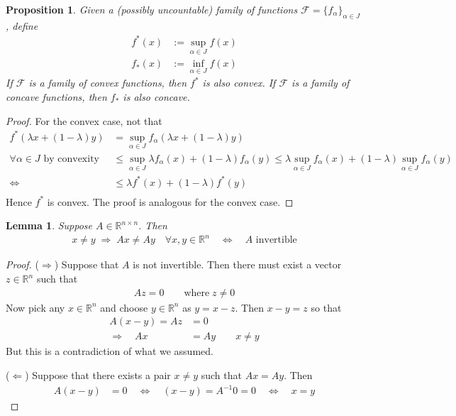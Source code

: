 \documentclass[12pt]{book}
\numberwithin{equation}{section} %
\theoremstyle{plain}
\newtheorem{lem}[thm]{Lemma}
\newtheorem{prop}[thm]{Proposition}
\theoremstyle{definition}
\theoremstyle{remark}
\newcommand{\Rn}{\mathbb{R}^n}
\newcommand{\Rnn}{\mathbb{R}^{n\times n}}
\begin{document}
\begin{prop}
\label{prop:supconvex}
Given a (possibly uncountable) family of functions
$\mathscr{F}=\{f_\alpha\}_{\alpha\in J}$, define
\begin{align*}
  f^*(x) &:= \sup_{\alpha\in J} f(x)\\
  f_*(x) &:= \inf_{\alpha\in J} f(x)
\end{align*}
If $\mathscr{F}$ is a family of convex functions, then $f^*$ is also
convex. If $\mathscr{F}$ is a family of concave functions, then $f_*$ is
also concave.
\end{prop}
\begin{proof}
For the convex case, not that
\begin{align*}
  f^*(\lambda x + (1-\lambda)y)
  &= \sup_{\alpha \in J}
  f_\alpha(\lambda x + (1-\lambda)y)\\
  \text{$\forall \alpha\in J$ by convexity} \qquad
  &\leq \sup_{\alpha \in J}
  \lambda f_\alpha(x) + (1-\lambda)f_\alpha(y)
  \leq \lambda \sup_{\alpha \in J} f_\alpha(x)
  + (1-\lambda)\sup_{\alpha \in J} f_\alpha(y)\\
  \Leftrightarrow\quad
  &\leq \lambda f^*(x)
  + (1-\lambda) f^*(y)\\
\end{align*}
Hence $f^*$ is convex. The proof is analogous for the convex case.
\end{proof}

\begin{lem}
\label{lem:unique-invertible}
Suppose $A\in\Rnn$. Then
\begin{align*}
  x\neq y\;\Rightarrow\;
  Ax \neq Ay
  \quad \forall x,y\in\Rn
  \quad\iff\quad
  \text{$A$ invertible}
\end{align*}
\end{lem}
\begin{proof}
($\Rightarrow$) Suppose that $A$ is not invertible. Then there must
exist a vector $z\in\Rn$ such that
\begin{align*}
  Az = 0
  \qquad \text{where} \; z\neq 0
\end{align*}
Now pick any $x\in\Rn$ and choose $y\in\Rn$ as $y=x-z$. Then
$x-y=z$ so that
\begin{align*}
  A(x-y) = Az &= 0 \\
  \Rightarrow\quad
  Ax &= Ay
  \qquad x\neq y
\end{align*}
But this is a contradiction of what we assumed.

($\Leftarrow$) Suppose that there exists a pair $x\neq y$ such that
$Ax=Ay$. Then
\begin{align*}
  A(x-y) &= 0
  \quad\iff\quad
  (x-y) = A^{-1}0 = 0
  \quad\iff\quad
  x =y
\end{align*}
\end{proof}
\end{document}
